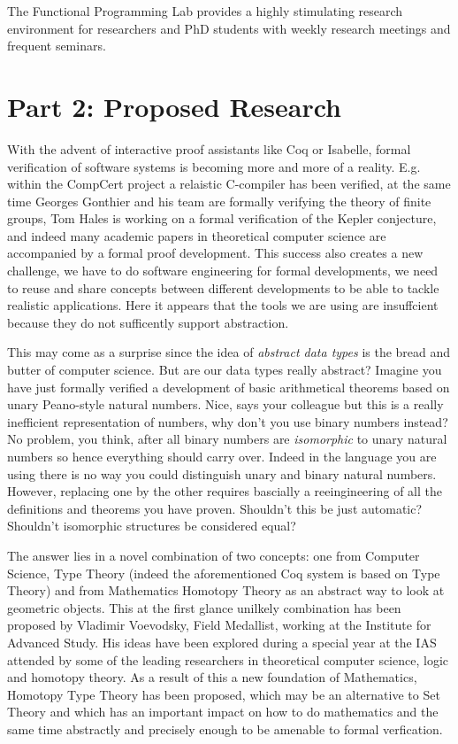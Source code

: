 \documentclass[twocolumn,a4paper,11pt]{article}
\begin{document}
{The Functional Programming Lab provides a highly stimulating
research environment for researchers and PhD students with weekly
research meetings and frequent seminars. 



\newpage

\section*{Part 2: Proposed Research}

With the advent of interactive proof assistants like Coq or Isabelle,
formal verification of software systems is becoming more and more of a
reality. E.g. within the CompCert project a relaistic C-compiler has
been verified, at the same time Georges Gonthier and his team are
formally verifying the theory of finite groups, Tom Hales is
working on a formal verification of the Kepler conjecture, and indeed
many academic papers in theoretical computer science are accompanied
by a formal proof development. This success also creates a new
challenge, we have to do software engineering for formal developments,
we need to reuse and share concepts between different developments to
be able to tackle realistic applications. Here it appears that the
tools we are using are insuffcient because they do not sufficently
support abstraction. 

This may come as a surprise since the idea of
\emph{abstract data types} is the bread and butter of computer
science. But are our data types really abstract? Imagine you have
just formally verified a development of basic arithmetical theorems
based on unary Peano-style natural numbers. Nice, says your colleague
but this is a really inefficient representation of numbers, why don't
you use binary numbers instead? No problem, you think, after all
binary numbers are \emph{isomorphic} to unary natural numbers
so hence everything should carry over. Indeed in the language you are
using there is no way you could distinguish unary and binary natural
numbers. However, replacing one by the other requires bascially a
reeingineering of all the definitions and theorems you have
proven. Shouldn't this be just automatic? Shouldn't isomorphic
structures be considered equal?

The answer lies in a novel combination of two concepts: one from
Computer Science, Type Theory (indeed the aforementioned Coq system is
based on Type Theory) and from Mathematics Homotopy Theory as an
abstract way to look at geometric objects. This at the first glance
unilkely combination has been proposed by Vladimir Voevodsky, Field
Medallist, working at the Institute for Advanced Study. His ideas have
been explored during a special year at the IAS attended by some of the
leading researchers in theoretical computer science, logic and
homotopy theory. As a result of this a new foundation of Mathematics,
Homotopy Type Theory has been proposed, which may be an alternative to
Set Theory and which has an important impact on how to do mathematics
and the same time abstractly and precisely enough to be amenable to
formal verfication.  

}
\end{document}
